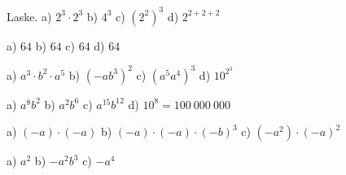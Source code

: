 \begin{tehtavasivu}
    \begin{tehtava}%
        \begin{alakohdat}
		\end{alakohdat}        
        \begin{vastaus}
        \begin{alakohdat}
        \end{alakohdat}
        \end{vastaus}
    \end{tehtava}     


    \begin{tehtava}
        Laske. \quad
        a) $2^3\cdot2^3$ \qquad
        b) $4^3$ \qquad
        c) $(2^2)^3$ \qquad
        d) $2^{2+2+2}$

        \begin{vastaus}
            a) $64$ \qquad
            b) $64$ \qquad
            c) $64$ \qquad
            d) $64$
        \end{vastaus}
    \end{tehtava}

\begin{tehtava}
        a) $a^3\cdot b^2\cdot a^5$ \qquad 
        b) $(-ab^3)^2$ \qquad 
        c) $(a^5a^4)^3$ \qquad 
        d) $10^{2^3}$

        \begin{vastaus}
            a) $a^8b^2$ \qquad
            b) $a^2b^6$ \qquad
            c) $a^{15}b^{12}$ \qquad
            d) $10^8 = 100~000~000$
        \end{vastaus}
    \end{tehtava}

    \begin{tehtava}
        a) $(-a)\cdot(-a)$ \qquad
        b) $(-a)\cdot(-a)\cdot(-b)^3$ \qquad
        c) $(-a^2)\cdot(-a)^2$

        \begin{vastaus}
            a) $a^2$ \qquad
            b) $-a^2b^3$ \qquad
            c) $-a^4$
        \end{vastaus}
    \end{tehtava}


\end{tehtavasivu}

